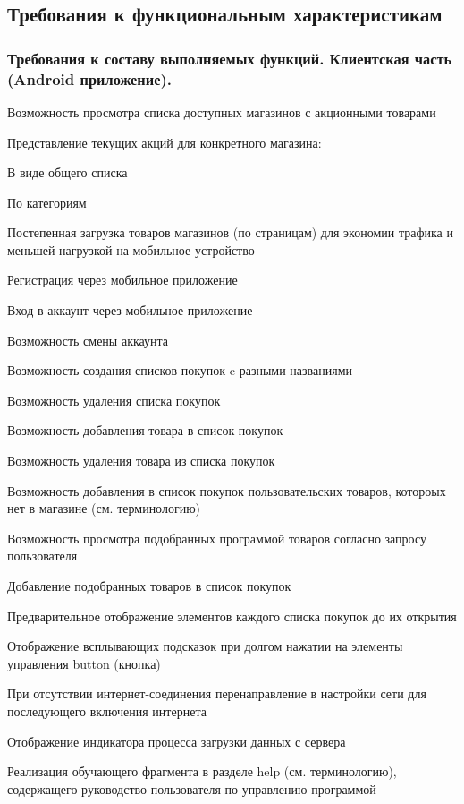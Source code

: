 \subsection{Требования к функциональным характеристикам}
\subsubsection{Требования к составу выполняемых функций. Клиентская часть (Android приложение).}
\begin{my_enumerate}
\item Возможность просмотра списка доступных магазинов с акционными товарами
\item Представление текущих акций для конкретного магазина:
    \begin{my_enumerate}
    \item В виде общего списка
    \item По категориям
    \end{my_enumerate}
\item Постепенная загрузка товаров магазинов (по страницам) для экономии трафика и меньшей нагрузкой на мобильное устройство
\item Регистрация через мобильное приложение
\item Вход в аккаунт через мобильное приложение
\item Возможность смены аккаунта
\item Возможность создания списков покупок c разными названиями
\item Возможность удаления списка покупок
\item Возможность добавления товара в список покупок
\item Возможность удаления товара из списка покупок
\item Возможность добавления в список покупок пользовательских товаров, котороых нет в магазине (см. терминологию)
\item Возможность просмотра подобранных программой товаров согласно запросу пользователя
\item Добавление подобранных товаров в список покупок
\item Предварительное отображение элементов каждого списка покупок до их открытия
\item Отображение всплывающих подсказок при долгом нажатии на элементы управления button (кнопка)
\item При отсутствии интернет-соединения перенаправление в настройки сети для последующего включения интернета
\item Отображение индикатора процесса загрузки данных с сервера
\item Реализация обучающего фрагмента в разделе help (см. терминологию), содержащего руководство пользователя по управлению программой
\end{my_enumerate}

